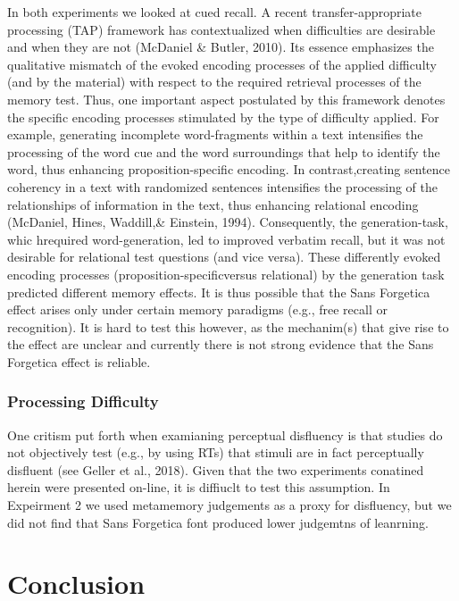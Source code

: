 \documentclass[doc]{apa6}
\begin{document}
In both experiments we looked at cued recall. A recent transfer-appropriate processing (TAP) framework has contextualized when difficulties are desirable and when they are not (McDaniel \& Butler, 2010). Its essence emphasizes the qualitative mismatch of the evoked encoding processes of the applied difficulty (and by the material) with respect to the required retrieval processes of the memory test. Thus, one important aspect postulated by this framework denotes the specific encoding processes stimulated by the type of difficulty applied. For example, generating incomplete word-fragments within a text intensifies the processing of the word cue and the word surroundings that help to identify the word, thus enhancing proposition-specific encoding. In contrast,creating sentence coherency in a text with randomized sentences intensifies the processing of the relationships of information in the text, thus enhancing relational encoding (McDaniel, Hines, Waddill,\& Einstein, 1994). Consequently, the generation-task, whic hrequired word-generation, led to improved verbatim recall, but it was not desirable for relational test questions (and vice versa). These differently evoked encoding processes (proposition-specificversus relational) by the generation task predicted different memory effects. It is thus possible that the Sans Forgetica effect arises only under certain memory paradigms (e.g., free recall or recognition). It is hard to test this however, as the mechanim(s) that give rise to the effect are unclear and currently there is not strong evidence that the Sans Forgetica effect is reliable.

\hypertarget{processing-difficulty}{%
\subsubsection{Processing Difficulty}\label{processing-difficulty}}

One critism put forth when examianing perceptual disfluency is that studies do not objectively test (e.g., by using RTs) that stimuli are in fact perceptually disfluent (see Geller et al., 2018). Given that the two experiments conatined herein were presented on-line, it is diffiuclt to test this assumption. In Expeirment 2 we used metamemory judgements as a proxy for disfluency, but we did not find that Sans Forgetica font produced lower judgemtns of leanrning.

\hypertarget{conclusion}{%
\section{Conclusion}\label{conclusion}}
\end{document}
